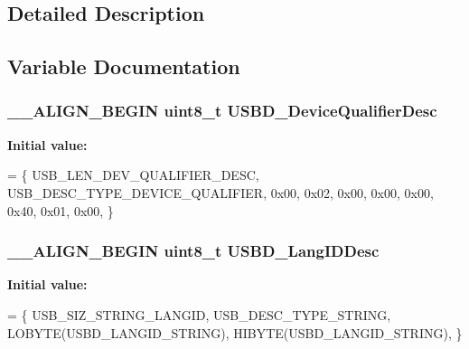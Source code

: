 \subsection{Detailed Description}


\subsection{Variable Documentation}
\hypertarget{group__USBD__DESC__Exported__Variables_ga0e9a59a2d3dc522b7841b51196be662d}{
\subsubsection[{U\-S\-B\-D\-\_\-\-Device\-Qualifier\-Desc}]{\setlength{\rightskip}{0pt plus 5cm}\-\_\-\-\_\-\-A\-L\-I\-G\-N\-\_\-\-B\-E\-G\-I\-N uint8\-\_\-t U\-S\-B\-D\-\_\-\-Device\-Qualifier\-Desc}}\label{group__USBD__DESC__Exported__Variables_ga0e9a59a2d3dc522b7841b51196be662d}
{\bfseries Initial value\-:}
\begin{DoxyCode}
=
\{
  USB\_LEN\_DEV\_QUALIFIER\_DESC,
  USB\_DESC\_TYPE\_DEVICE\_QUALIFIER,
  0x00,
  0x02,
  0x00,
  0x00,
  0x00,
  0x40,
  0x01,
  0x00,
\}
\end{DoxyCode}
\hypertarget{group__USBD__DESC__Exported__Variables_ga7861bd84bd7d6ab7f110bf6f3a6b7577}{
\subsubsection[{U\-S\-B\-D\-\_\-\-Lang\-I\-D\-Desc}]{\setlength{\rightskip}{0pt plus 5cm}\-\_\-\-\_\-\-A\-L\-I\-G\-N\-\_\-\-B\-E\-G\-I\-N uint8\-\_\-t U\-S\-B\-D\-\_\-\-Lang\-I\-D\-Desc}}\label{group__USBD__DESC__Exported__Variables_ga7861bd84bd7d6ab7f110bf6f3a6b7577}
{\bfseries Initial value\-:}
\begin{DoxyCode}
=
\{
     USB\_SIZ\_STRING\_LANGID,         
     USB\_DESC\_TYPE\_STRING,       
     LOBYTE(USBD\_LANGID\_STRING),
     HIBYTE(USBD\_LANGID\_STRING), 
\}
\end{DoxyCode}
